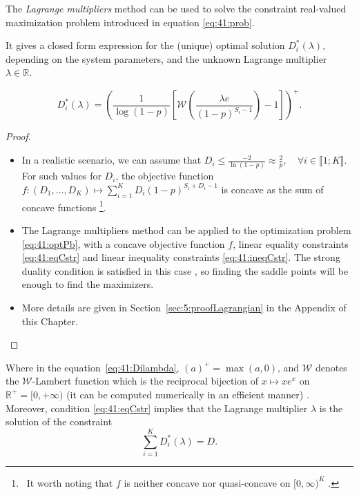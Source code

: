 \begin{proposition}\label{prop:41:Lagrangian}
    The \emph{Lagrange multipliers} method \cite{BoydVanderberghe04} can be used to solve the constraint real-valued maximization problem introduced in equation \eqref{eq:41:prob}.

    It gives a closed form expression for the (unique) optimal solution $D_i^*(\lambda)$, depending on the system parameters, and the unknown Lagrange multiplier $\lambda \in \mathbb{R}$.

    \begin{equation}\label{eq:41:Dilambda}
        D_i^*(\lambda) = \left(\frac{1}{\log(1-p)}\left[ \mathcal{W}\left(\frac{\lambda e}{(1-p)^{S_i-1}} \right)-1 \right]\right)^{+} .
    \end{equation}
\end{proposition}

\begin{proof}
\begin{itemize}
    \item
    In a realistic scenario, we can assume that $D_i\leq \frac{-2}{\ln\left(1-p\right)} \approx \frac{2}{p},\quad \forall i\in\llbracket 1;K \rrbracket$. For such values for $D_i$, the objective function $f: (D_1, \dots, D_{K}) \mapsto \sum_{i=1}^{K} D_i (1 - p)^{S_i + D_i -1}$ is concave as the sum of concave functions
    \footnote{~It worth noting that $f$ is neither concave nor quasi-concave on $[0,\infty)^{K}$ \cite{Luenberger68,Yaari77}.}.
    \item
    The Lagrange multipliers method can be applied to the optimization problem \eqref{eq:41:optPb}, with a concave objective function $f$, linear equality constraints \eqref{eq:41:eqCstr} and linear inequality constraints \eqref{eq:41:ineqCstr}. The strong duality condition is satisfied in this case \cite{BoydVanderberghe04}, so finding the saddle points will be enough to find the maximizers.
    \item
    More details are given in Section~\ref{sec:5:proofLagrangian} in the Appendix of this Chapter.
    \end{itemize}
\end{proof}

Where in the equation~\eqref{eq:41:Dilambda}, $(a)^{+} = \max(a,0)$, and $\mathcal{W}$ denotes the $\mathcal{W}$-Lambert function which is the reciprocal bijection of $x \mapsto x e^x$ on $\mathbb{R^+} = [0, +\infty)$ (it can be computed numerically in an efficient manner) \cite{Corless96}.
Moreover, condition \eqref{eq:41:eqCstr} implies that the Lagrange multiplier $\lambda$ is the solution of the constraint
\begin{equation}\label{eq:41:constraintLambda}
 \sum_{i=1}^{K} D_i^*(\lambda) = D.
\end{equation}


